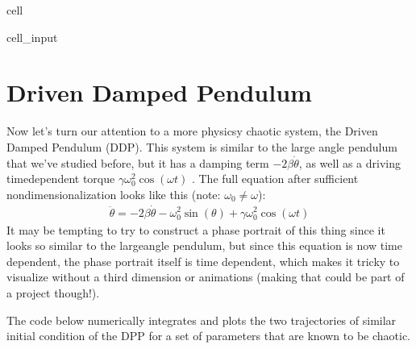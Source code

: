 \documentclass[letterpaper,10pt,english]{jupyterBook}
\begin{document}
\begin{sphinxuseclass}{cell}\begin{sphinxVerbatimInput}

\begin{sphinxuseclass}{cell_input}
\begin{sphinxVerbatim}[commandchars=\\\{\}]
\end{sphinxVerbatim}

\end{sphinxuseclass}\end{sphinxVerbatimInput}

\end{sphinxuseclass}

\section{Driven Damped Pendulum}
\label{\detokenize{content/1_mechanics/CHAOS:driven-damped-pendulum}}
\sphinxAtStartPar
Now let’s turn our attention to a more physics\sphinxhyphen{}y chaotic system, the Driven Damped Pendulum (DDP). This system is similar to the large angle pendulum that we’ve studied before, but it has a damping term \(-2\beta\dot{\theta}\), as well as a driving time\sphinxhyphen{}dependent torque \(\gamma \omega_0^2\cos(\omega t)\) . The full equation after sufficient non\sphinxhyphen{}dimensionalization looks like this (note: \(\omega_0 \neq \omega\)):
\begin{equation*}
\begin{split}
\ddot{\theta} = - 2\beta\dot{\theta} - \omega_0^2\sin(\theta) + \gamma \omega_0^2 \cos(\omega t)
\end{split}
\end{equation*}
\sphinxAtStartPar
It may be tempting to try to construct a phase portrait of this thing since it looks so similar to the large\sphinxhyphen{}angle pendulum, but since this equation is now time dependent, the phase portrait itself is time dependent, which makes it tricky to visualize without a third dimension or animations (making that could be part of a project though!).

\sphinxAtStartPar
The code below numerically integrates and plots the two trajectories of similar initial condition of the DPP for a set of parameters that are known to be chaotic.
\end{document}
